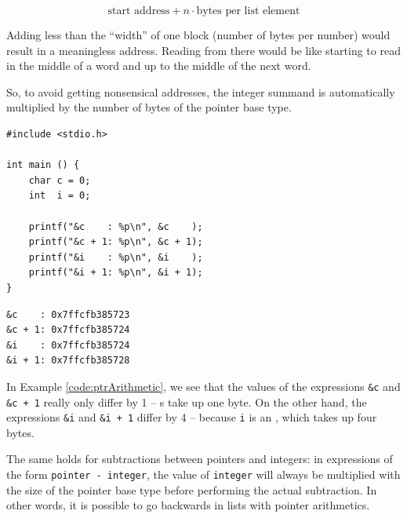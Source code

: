 {{{{\begin{defbox}
\[ \text{start address} + n \cdot \textrm{bytes per list element} \]
\end{defbox}

Adding less than the \enquote{width} of one block (\ie number of bytes per number) would result in a meaningless address. Reading from there would be like starting to read in the middle of a word and up to the middle of the next word.

So, to avoid getting nonsensical addresses, the integer summand is automatically multiplied by the number of bytes of the pointer base type.

\begin{tcbraster}[raster columns=2,
                  raster equal height,
                  nobeforeafter,
                  raster column skip=0.2cm]
\begin{codebox}[pointerArithmetic.c]
\begin{verbatim}
#include <stdio.h>

int main () {
    char c = 0;
    int  i = 0;

    printf("&c    : %p\n", &c    );
    printf("&c + 1: %p\n", &c + 1);
    printf("&i    : %p\n", &i    );
    printf("&i + 1: %p\n", &i + 1);
}
\end{verbatim}
 \label{code:ptrArithmetic}
\end{codebox}
%
\begin{cmdbox}
\begin{verbatim}
&c    : 0x7ffcfb385723
&c + 1: 0x7ffcfb385724
&i    : 0x7ffcfb385724
&i + 1: 0x7ffcfb385728
\end{verbatim}
\end{cmdbox}
\end{tcbraster}

In Example \ref{code:ptrArithmetic}, we see that the values of the expressions \texttt{\&c} and \texttt{\&c + 1} really only differ by 1 -- s take up one byte. On the other hand, the expressions \texttt{\&i} and \texttt{\&i + 1} differ by 4 -- because \texttt{i} is an , which takes up four bytes.

The same holds for subtractions between pointers and integers: in expressions of the form \texttt{pointer - integer}, the value of \texttt{integer} will always be multiplied with the size of the pointer base type before performing the actual subtraction. In other words, it is possible to go backwards in lists with pointer arithmetics.

}}}}
